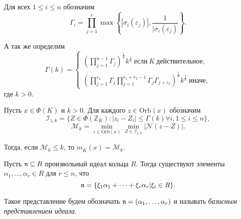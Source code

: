 \documentclass[_00_dissertation.tex]{subfiles}
\begin{document}
\begin{definition}
    Для всех $1 \le i \le n$ обозначим
    \begin{equation*}
        \Gamma_i = \prod\limits_{j=1}^r \max\left\{
            |\sigma_i(\varepsilon_j)|, \frac{1}{|\sigma_i(\varepsilon_j)}
        \right\}.
    \end{equation*}

    А так же определим
    \begin{equation*}
        \Gamma(k) =
        \begin{cases}
            \left(
                \prod\limits_{j=1}^{n-1} \Gamma_j
            \right)^{\frac{1}{n}} k^{\frac{1}{n}}\ \textrm{если}\ K\ \textrm{действительное},\\
            \left(
                \prod\limits_{j=1}^{r_1} \Gamma_j \prod\limits_{j=1}^{r_1+r_2-1} \Gamma_j \Gamma_{j+r_2}
            \right)^{\frac{1}{n}} k^{\frac{1}{n}}\ \textrm{иначе},
        \end{cases}
    \end{equation*}
    где $k>0$.
\end{definition}

\begin{statement}\label{proposition:division_with_least_norm_remainder}\cite{source:Lezowski}
    Пусть $x \in \Phi(K)$ и $k > 0$.
    Для каждого $z \in \textrm{Orb}(x)$ обозначим
    \begin{equation*}
        \mathcal{I}_{z, k} = \{Z \in \Phi(\mathbb{Z}_K): |z_i-Z_i| \le \Gamma(k) \forall i, 1 \le i \le n\},
    \end{equation*}
    \begin{equation*}
        \mathcal{M}_k = \min\limits_{z \in \textrm{Orb}(x)} \min\limits_{Z \in \mathcal{I}_{z, k}} |\mathcal{N}(z-Z)|.
    \end{equation*}

    Тогда, если $\mathcal{M}_k \le k$, то $m_{\overline{K}}(x) = \mathcal{M}_k$.
\end{statement}

\begin{definition}
    Пусть $\mathfrak{n} \subseteq R$ произвольный идеал кольца $R$.
    Тогда существуют элементы $\alpha_1, \dots, \alpha_r \in R$ для $r \leq n$, что
    \begin{equation*}
        \mathfrak{n} = \{\xi_1 \alpha_1 + \dots + \xi_r \alpha_r | \xi_i \in R\}.
    \end{equation*}
    
    Такое представление будем обозначать $\mathfrak{n} = (\alpha_1, \dots, \alpha_r)$ и называть \emph{базисным представлением идеала}.
\end{definition}
\end{document}
